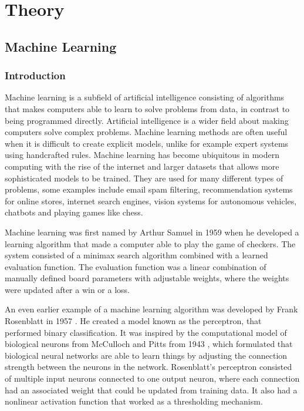 \chapter{Theory}\label{cpt:theory}

\section{Machine Learning}

\subsection{Introduction}

Machine learning is a subfield of artificial intelligence consisting of algorithms that makes computers able to learn to solve problems from data, in contrast to being programmed directly. Artificial intelligence is a wider field about making computers solve complex problems. Machine learning methods are often useful when it is difficult to create explicit models, unlike for example expert systems using handcrafted rules. Machine learning has become ubiquitous in modern computing with the rise of the internet and larger datasets that allows more sophisticated models to be trained. They are used for many different types of problems, some examples include email spam filtering, recommendation systems for online stores, internet search engines, vision systems for autonomous vehicles, chatbots and playing games like chess.

Machine learning was first named by Arthur Samuel in 1959 \cite{samuel59} when he developed a learning algorithm that made a computer able to play the game of checkers. The system consisted of a minimax search algorithm combined with a learned evaluation function. The evaluation function was a linear combination of manually defined board parameters with adjustable weights, where the weights were updated after a win or a loss.

An even earlier example of a machine learning algorithm was developed by Frank Rosenblatt in 1957 \cite{rosenblatt57}. He created a model known as the perceptron, that performed binary classification. It was inspired by the computational model of biological neurons from McCulloch and Pitts from 1943 \cite{pitts43}, which formulated that biological neural networks are able to learn things by adjusting the connection strength between the neurons in the network. Rosenblatt's perceptron consisted of multiple input neurons connected to one output neuron, where each connection had an associated weight that could be updated from training data. It also had a nonlinear activation function that worked as a thresholding mechanism.

